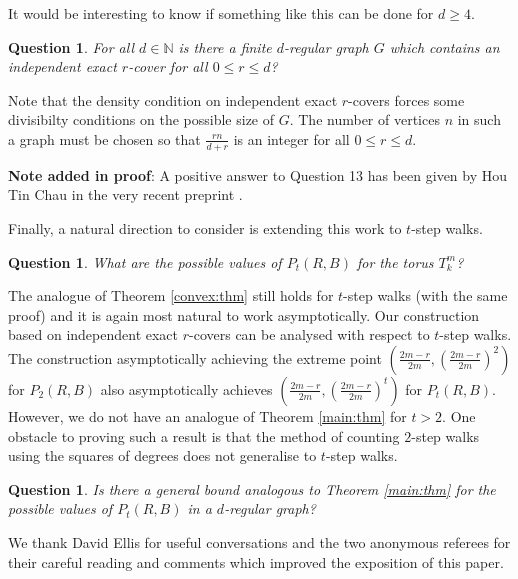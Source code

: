 \documentclass[12pt,a4paper]{article}
\newcommand{\N}{\mathbb N}
\newtheorem{q}[thm]{Question}
\begin{document}
It would be interesting to know if something like this can be done for $d\geq 4$.

\begin{q}
For all $d\in\N$ is there a finite $d$-regular graph $G$ which contains an independent exact $r$-cover for all $0\leq r\leq d$?
\end{q}

Note that the density condition on independent exact $r$-covers forces some divisibilty conditions on the possible size of $G$. The number of vertices $n$ in such a graph must be chosen so that $\frac{rn}{d+r}$ is an integer for all $0\leq r\leq d$.

\noindent
{\bf Note added in proof}: A positive answer to Question 13 has been given by Hou Tin Chau in the very recent preprint \cite{chau}.

Finally, a natural direction to consider is extending this work to $t$-step walks.

\begin{q}
What are the possible values of $P_t(R,B)$ for the torus $T^m_k$?
\end{q} 

The analogue of Theorem \ref{convex:thm} still holds for $t$-step walks (with the same proof) and it is again most natural to work asymptotically. Our construction based on independent exact $r$-covers can be analysed with respect to $t$-step walks. The construction asymptotically achieving the extreme point $\left(\frac{2m-r}{2m},\left(\frac{2m-r}{2m}\right)^2\right)$ for $P_2(R,B)$ also asymptotically achieves $\left(\frac{2m-r}{2m},\left(\frac{2m-r}{2m}\right)^t\right)$ for $P_t(R,B)$. However, we do not have an analogue of Theorem \ref{main:thm} for $t>2$. One obstacle to proving such a result is that the method of counting $2$-step walks using the squares of degrees does not generalise to $t$-step walks. 

\begin{q}
Is there a general bound analogous to Theorem \ref{main:thm} for the possible values of $P_t(R,B)$ in a $d$-regular graph?
\end{q} 

 We thank David Ellis for useful conversations and the two anonymous referees for their careful reading and comments which improved the exposition of this paper. 


	
\end{document}
